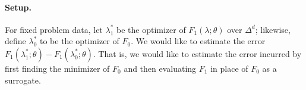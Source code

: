 \documentclass[eikonal.tex]{subfiles}
\begin{document}


\paragraph{Setup.} For fixed problem data, let $\lambda_1^*$ be the
optimizer of $F_1(\lambda; \theta)$ over $\Delta^d$; likewise, define
$\lambda_0^*$ to be the optimizer of $F_0$. We would like to estimate
the error $F_1(\lambda^*_1; \theta) - F_1(\lambda^*_0; \theta)$. That
is, we would like to estimate the error incurred by first finding the
minimizer of $F_0$ and then evaluating $F_1$ in place of $F_0$ as a
surrogate.
\end{document}
